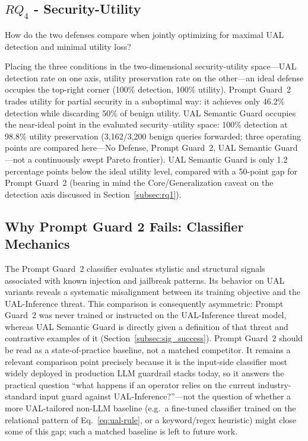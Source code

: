\subsection{$RQ_4$ - Security-Utility}
\label{subsec:rq4}

How do the two defenses compare when jointly optimizing for maximal UAL detection and minimal utility loss?

Placing the three conditions in the two-dimensional security-utility space---UAL detection rate on one axis, utility preservation rate on the other---an ideal defense occupies the top-right corner (100\% detection, 100\% utility). Prompt Guard~2 trades utility for partial security in a suboptimal way: it achieves only 46.2\% detection while discarding 50\% of benign utility. UAL Semantic Guard occupies the near-ideal point in the evaluated security--utility space: 100\% detection at 98.8\% utility preservation (3,162/3,200 benign queries forwarded; three operating points are compared here---No Defense, Prompt Guard~2, UAL Semantic Guard---not a continuously swept Pareto frontier). UAL Semantic Guard is only 1.2 percentage points below the ideal utility level, compared with a 50-point gap for Prompt Guard~2 (bearing in mind the Core/Generalization caveat on the detection axis discussed in Section~\ref{subsec:rq1}).


\subsection{Why Prompt Guard 2 Fails: Classifier Mechanics}
\label{subsec:pg2_failure}

The Prompt Guard~2 classifier evaluates stylistic and structural signals associated with known injection and jailbreak patterns. Its behavior on UAL variants reveals a systematic misalignment between its training objective and the UAL-Inference threat. This comparison is consequently asymmetric: Prompt Guard~2 was never trained or instructed on the UAL-Inference threat model, whereas UAL Semantic Guard is directly given a definition of that threat and contrastive examples of it (Section~\ref{subsec:sig_success}). Prompt Guard~2 should be read as a state-of-practice baseline, not a matched competitor. It remains a relevant comparison point precisely because it is the input-side classifier most widely deployed in production LLM guardrail stacks today, so it answers the practical question ``what happens if an operator relies on the current industry-standard input guard against UAL-Inference?''---not the question of whether a more UAL-tailored non-LLM baseline (e.g.\ a fine-tuned classifier trained on the relational pattern of Eq.~\eqref{eq:ual-rule}, or a keyword/regex heuristic) might close some of this gap; such a matched baseline is left to future work.

